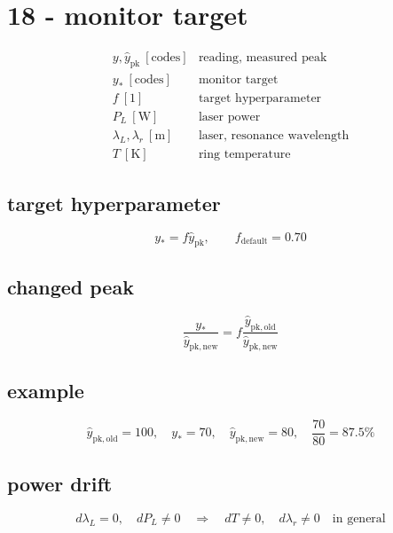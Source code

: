 \section*{18 - monitor target}

\[
\begin{array}{ll}y,\widehat y_{\mathrm{pk}}\ [\mathrm{codes}]&\text{reading, measured peak}\\[0.6em]y_*\ [\mathrm{codes}]&\text{monitor target}\\[0.6em]f\ [1]&\text{target hyperparameter}\\[0.6em]P_L\ [\mathrm W]&\text{laser power}\\[0.6em]\lambda_L,\lambda_r\ [\mathrm m]&\text{laser, resonance wavelength}\\[0.6em]T\ [\mathrm K]&\text{ring temperature}\end{array}
\]

\subsection*{target hyperparameter}
\[
\displaystyle y_*=f\widehat y_{\mathrm{pk}},\qquad f_{\mathrm{default}}=0.70
\]

\subsection*{changed peak}
\[
\displaystyle \frac{y_*}{\widehat y_{\mathrm{pk,new}}}=f\frac{\widehat y_{\mathrm{pk,old}}}{\widehat y_{\mathrm{pk,new}}}
\]

\subsection*{example}
\[
\displaystyle \widehat y_{\mathrm{pk,old}}=100,\quad y_*=70,\quad\widehat y_{\mathrm{pk,new}}=80,\quad\frac{70}{80}=87.5\%
\]

\subsection*{power drift}
\[
\displaystyle d\lambda_L=0,\quad dP_L\ne0\quad\Longrightarrow\quad dT\ne0,\quad d\lambda_r\ne0\quad\text{in general}
\]
